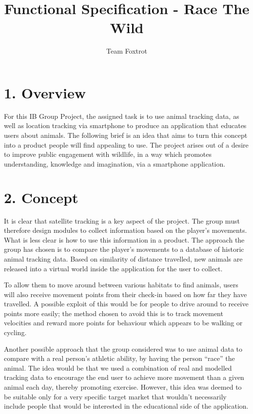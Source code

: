 \documentclass[]{report}
\title{Functional Specification - Race The Wild}
\author{Team Foxtrot}
\begin{document}
\maketitle

\section*{1. Overview}

For this IB Group Project, the assigned task is to use animal tracking data, as well as location tracking via smartphone to produce an application that educates users about animals. The following brief is an idea that aims to turn this concept into a product people will find appealing to use. The project arises out of a desire to improve public engagement with wildlife, in a way which promotes understanding, knowledge and imagination, via a smartphone application.

\section*{2. Concept}

It is clear that satellite tracking is a key aspect of the project. The group must therefore design modules to collect information based on the player's movements. What is less clear is how to use this information in a product. The approach the group has chosen is to compare the player's movements to a database of historic animal tracking data. Based on similarity of distance travelled, new animals are released into a virtual world inside the application for the user to collect. 

To allow them to move around between various habitats to find animals, users will also receive movement points from their check-in based on how far they have travelled. A possible exploit of this would be for people to drive around to receive points more easily; the method chosen to avoid this is to track movement velocities and reward more points for behaviour which appears to be walking or cycling. 

Another possible approach that the group considered was to use animal data to compare with a real person's athletic ability, by having the person ``race'' the animal. The idea would be that we used a combination of real and modelled tracking data to encourage the end user to achieve more movement than a given animal each day, thereby promoting exercise. However, this idea was deemed to be suitable only for a very specific target market that wouldn't necessarily include people that would be interested in the educational side of the application.
\end{document}

